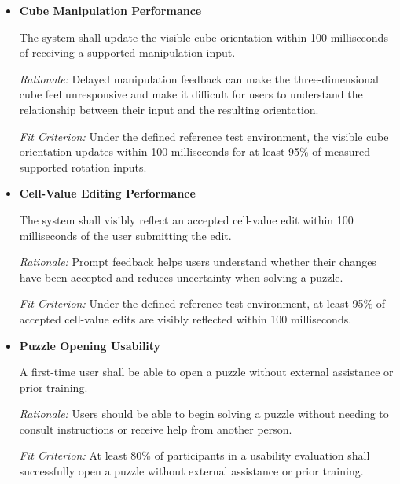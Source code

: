 \documentclass[12pt]{article}
\newcounter{nfrnum} %
\begin{document}
\noindent
\begin{itemize}


\item[NFR\refstepcounter{nfrnum}\thenfrnum
\label{NFR_1}:]
\textbf{Cube Manipulation Performance}

The system shall update the visible cube orientation within
100 milliseconds of receiving a supported manipulation input.

\textit{Rationale:} Delayed manipulation feedback can make the
three-dimensional cube feel unresponsive and make it difficult
for users to understand the relationship between their input
and the resulting orientation.

\textit{Fit Criterion:} Under the defined reference test
environment, the visible cube orientation updates within
100 milliseconds for at least 95\% of measured supported
rotation inputs.


\item[NFR\refstepcounter{nfrnum}\thenfrnum
\label{NFR_2}:]
\textbf{Cell-Value Editing Performance}

The system shall visibly reflect an accepted cell-value edit
within 100 milliseconds of the user submitting the edit.

\textit{Rationale:} Prompt feedback helps users understand
whether their changes have been accepted and reduces
uncertainty when solving a puzzle.

\textit{Fit Criterion:} Under the defined reference test
environment, at least 95\% of accepted cell-value edits are
visibly reflected within 100 milliseconds.



\item[NFR\refstepcounter{nfrnum}\thenfrnum
\label{NFR_3}:]
\textbf{Puzzle Opening Usability}

A first-time user shall be able to open a puzzle without
external assistance or prior training.

\textit{Rationale:} Users should be able to begin solving
a puzzle without needing to consult instructions or receive
help from another person.

\textit{Fit Criterion:} At least 80\% of participants in a
usability evaluation shall successfully open a puzzle without
external assistance or prior training.



\end{itemize}
\end{document}

